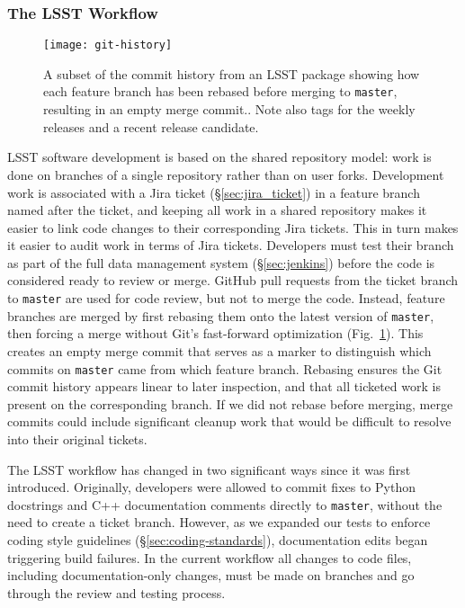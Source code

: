 \subsubsection{The LSST Workflow}\label{sec:dev_workflow}

\begin{figure}[t]
\begin{center}
  \texttt{[image: git-history]}
\end{center}
\caption{A subset of the commit history from an  LSST package showing how each feature branch has been rebased before merging to \texttt{master}, resulting in an empty merge commit..
Note also  tags for the weekly releases and a recent release candidate.
\label{fig:commitlog}
}
\end{figure}

LSST software development is based on the shared repository model: work is done on branches of a single repository rather than on user forks.
Development work is associated with a Jira ticket (\S\ref{sec:jira_ticket}) in a feature branch named after the ticket, and keeping all work in a shared repository makes it easier to link code changes to their corresponding Jira tickets.
This in turn makes it easier to audit work in terms of Jira tickets.
Developers must test their branch as part of the full data management system (\S\ref{sec:jenkins}) before the code is considered ready to review or merge.
GitHub pull requests from the ticket branch to \texttt{master} are used for code review, but not to merge the code.
Instead, feature branches are merged by first rebasing them onto the latest version of \texttt{master}, then forcing a merge without Git's fast-forward optimization (Fig.~\ref{fig:commitlog}).
This creates an empty merge commit that serves as a marker to distinguish which commits on \texttt{master} came from which feature branch.
Rebasing ensures the Git commit history appears linear to later inspection, and that all ticketed work is present on the corresponding branch.
If we did not rebase before merging, merge commits could include significant cleanup work that would be difficult to resolve into their original tickets.

The LSST workflow has changed in two significant ways since it was first introduced.
Originally, developers were allowed to commit fixes to Python docstrings and C++ documentation comments directly to \texttt{master}, without the need to create a ticket branch.
However, as we expanded our tests to enforce coding style guidelines (\S\ref{sec:coding-standards}), documentation edits began triggering build failures.
In the current workflow all changes to code files, including documentation-only changes, must be made on branches and go through the review and testing process.

